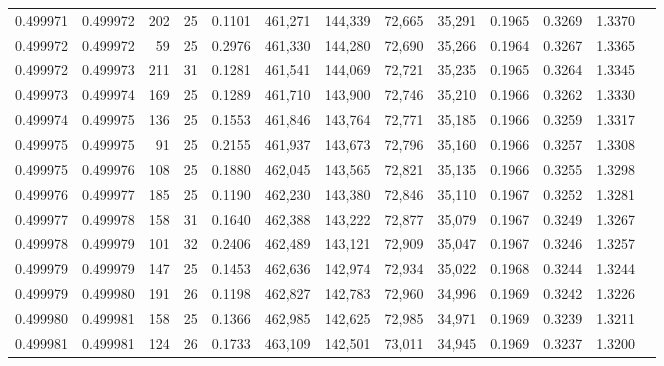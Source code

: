 \begin{tabular}{rrrrrrrrrrrrr}
0.499971 & 0.499972 & 202 &  25 &                                     0.1101 & 461,271 & 144,339 &  72,665 &  35,291 & 0.1965 & 0.3269 & 1.3370 \\
0.499972 & 0.499972 &  59 &  25 &                                     0.2976 & 461,330 & 144,280 &  72,690 &  35,266 & 0.1964 & 0.3267 & 1.3365 \\
0.499972 & 0.499973 & 211 &  31 &                                     0.1281 & 461,541 & 144,069 &  72,721 &  35,235 & 0.1965 & 0.3264 & 1.3345 \\
0.499973 & 0.499974 & 169 &  25 &                                     0.1289 & 461,710 & 143,900 &  72,746 &  35,210 & 0.1966 & 0.3262 & 1.3330 \\
0.499974 & 0.499975 & 136 &  25 &                                     0.1553 & 461,846 & 143,764 &  72,771 &  35,185 & 0.1966 & 0.3259 & 1.3317 \\
0.499975 & 0.499975 &  91 &  25 &                                     0.2155 & 461,937 & 143,673 &  72,796 &  35,160 & 0.1966 & 0.3257 & 1.3308 \\
0.499975 & 0.499976 & 108 &  25 &                                     0.1880 & 462,045 & 143,565 &  72,821 &  35,135 & 0.1966 & 0.3255 & 1.3298 \\
0.499976 & 0.499977 & 185 &  25 &                                     0.1190 & 462,230 & 143,380 &  72,846 &  35,110 & 0.1967 & 0.3252 & 1.3281 \\
0.499977 & 0.499978 & 158 &  31 &                                     0.1640 & 462,388 & 143,222 &  72,877 &  35,079 & 0.1967 & 0.3249 & 1.3267 \\
0.499978 & 0.499979 & 101 &  32 &                                     0.2406 & 462,489 & 143,121 &  72,909 &  35,047 & 0.1967 & 0.3246 & 1.3257 \\
0.499979 & 0.499979 & 147 &  25 &                                     0.1453 & 462,636 & 142,974 &  72,934 &  35,022 & 0.1968 & 0.3244 & 1.3244 \\
0.499979 & 0.499980 & 191 &  26 &                                     0.1198 & 462,827 & 142,783 &  72,960 &  34,996 & 0.1969 & 0.3242 & 1.3226 \\
0.499980 & 0.499981 & 158 &  25 &                                     0.1366 & 462,985 & 142,625 &  72,985 &  34,971 & 0.1969 & 0.3239 & 1.3211 \\
0.499981 & 0.499981 & 124 &  26 &                                     0.1733 & 463,109 & 142,501 &  73,011 &  34,945 & 0.1969 & 0.3237 & 1.3200 \\

\end{tabular}
